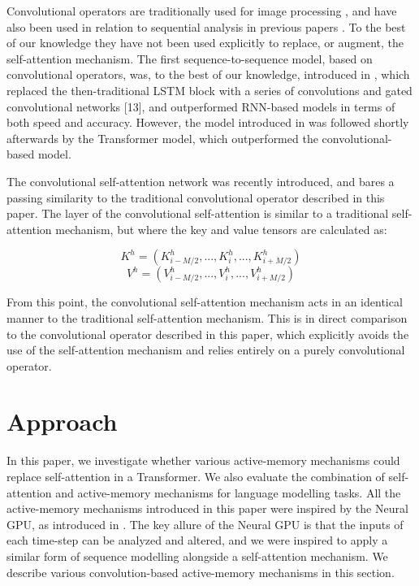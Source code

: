 \documentclass{article}
\begin{document}
Convolutional operators are traditionally used for image processing \cite{historyofdeeplearning}, and have also been used in relation to sequential analysis in previous papers \cite{yang2019} \cite{wu2019} \cite{gehring2017} \cite{glu2017}. To the best of our knowledge they have not been used explicitly to replace, or augment, the self-attention mechanism. The first sequence-to-sequence model, based on convolutional operators, was, to the best of our knowledge, introduced in \cite{gehring2017}, which replaced the then-traditional LSTM block with a series of convolutions and gated convolutional networks [13], and outperformed RNN-based models in terms of both speed and accuracy. However, the model introduced in \cite{gehring2017} was followed shortly afterwards by the Transformer model, which outperformed the convolutional-based model.

The convolutional self-attention network \cite{yang2019} was recently introduced, and bares a passing similarity to the traditional convolutional operator described in this paper. The layer of the convolutional self-attention is similar to a traditional self-attention mechanism, but where the key and value tensors are calculated as:

\[K^h = (K^h_{i - M/2}, ..., K^h_{i}, ..., K^h_{i + M/2}) \]
\[V^h = (V^h_{i - M/2}, ..., V^h_{i}, ..., V^h_{i + M/2}) \]

From this point, the convolutional self-attention mechanism acts in an identical manner to the traditional self-attention mechanism. This is in direct comparison to the convolutional operator described in this paper, which explicitly avoids the use of the self-attention mechanism and relies entirely on a purely convolutional operator.

\section{Approach}

In this paper, we investigate whether various active-memory mechanisms could replace self-attention in a Transformer. We also evaluate the combination of self-attention and active-memory mechanisms for language modelling tasks. All the active-memory mechanisms introduced in this paper were inspired by the Neural GPU, as introduced in \cite{kaiser2015}. The key allure of the Neural GPU is that the inputs of each time-step can be analyzed and altered, and we were inspired to apply a similar form of sequence modelling alongside a self-attention mechanism.
We describe various convolution-based active-memory mechanisms in this section.
 
\end{document}
